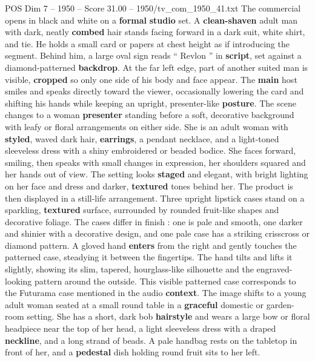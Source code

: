 \begin{textsample}{POS Dim 7 – 1950 – Score 31.00 – 1950/tv\_com\_1950\_41.txt}  \label{ex:f7_pos_001}
The commercial opens in black and white on a \textbf{formal} \textbf{studio} set.
A \textbf{clean-shaven} adult man with dark, neatly \textbf{combed} hair stands facing forward in a dark suit, white shirt, and tie.
He holds a small card or papers at chest height as if introducing the segment.
Behind him, a large oval sign reads “ Revlon ” in \textbf{script}, set against a diamond-patterned \textbf{backdrop}.
At the far left edge, part of another suited man is visible, \textbf{cropped} so only one side of his body and face appear.
The \textbf{main} host smiles and speaks directly toward the viewer, occasionally lowering the card and shifting his hands while keeping an upright, presenter-like \textbf{posture}.
The scene changes to a woman \textbf{presenter} standing before a soft, decorative background with leafy or floral arrangements on either side.
She is an adult woman with \textbf{styled}, waved dark hair, \textbf{earrings}, a pendant necklace, and a light-toned sleeveless dress with a shiny embroidered or beaded bodice.
She faces forward, smiling, then speaks with small changes in expression, her shoulders squared and her hands out of view.
The setting looks \textbf{staged} and elegant, with bright lighting on her face and dress and darker, \textbf{textured} tones behind her.
The product is then displayed in a still-life arrangement.
Three upright lipstick cases stand on a sparkling, \textbf{textured} surface, surrounded by rounded fruit-like shapes and decorative foliage.
The cases differ in finish : one is pale and smooth, one darker and shinier with a decorative design, and one pale case has a striking crisscross or diamond pattern.
A gloved hand \textbf{enters} from the right and gently touches the patterned case, steadying it between the fingertips.
The hand tilts and lifts it slightly, showing its slim, tapered, hourglass-like silhouette and the engraved-looking pattern around the outside.
This visible patterned case corresponds to the Futurama case mentioned in the audio \textbf{context}.
The image shifts to a young adult woman seated at a small round table in a \textbf{graceful} domestic or garden-room setting.
She has a short, dark bob \textbf{hairstyle} and wears a large bow or floral headpiece near the top of her head, a light sleeveless dress with a draped \textbf{neckline}, and a long strand of beads.
A pale handbag rests on the tabletop in front of her, and a \textbf{pedestal} dish holding round fruit sits to her left.

\end{textsample}
